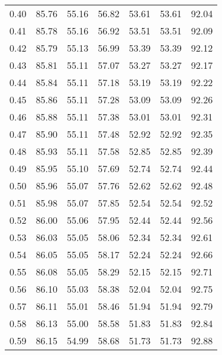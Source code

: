 \begin{tabular}{|c|c|c|c|c|c|c|}
      0.40 &     85.76 &     55.16 &      56.82 &   53.61 &      53.61 &         92.04 \\
      0.41 &     85.78 &     55.16 &      56.92 &   53.51 &      53.51 &         92.09 \\
      0.42 &     85.79 &     55.13 &      56.99 &   53.39 &      53.39 &         92.12 \\
      0.43 &     85.81 &     55.11 &      57.07 &   53.27 &      53.27 &         92.17 \\
      0.44 &     85.84 &     55.11 &      57.18 &   53.19 &      53.19 &         92.22 \\
      0.45 &     85.86 &     55.11 &      57.28 &   53.09 &      53.09 &         92.26 \\
      0.46 &     85.88 &     55.11 &      57.38 &   53.01 &      53.01 &         92.31 \\
      0.47 &     85.90 &     55.11 &      57.48 &   52.92 &      52.92 &         92.35 \\
      0.48 &     85.93 &     55.11 &      57.58 &   52.85 &      52.85 &         92.39 \\
      0.49 &     85.95 &     55.10 &      57.69 &   52.74 &      52.74 &         92.44 \\
      0.50 &     85.96 &     55.07 &      57.76 &   52.62 &      52.62 &         92.48 \\
      0.51 &     85.98 &     55.07 &      57.85 &   52.54 &      52.54 &         92.52 \\
      0.52 &     86.00 &     55.06 &      57.95 &   52.44 &      52.44 &         92.56 \\
      0.53 &     86.03 &     55.05 &      58.06 &   52.34 &      52.34 &         92.61 \\
      0.54 &     86.05 &     55.05 &      58.17 &   52.24 &      52.24 &         92.66 \\
      0.55 &     86.08 &     55.05 &      58.29 &   52.15 &      52.15 &         92.71 \\
      0.56 &     86.10 &     55.03 &      58.38 &   52.04 &      52.04 &         92.75 \\
      0.57 &     86.11 &     55.01 &      58.46 &   51.94 &      51.94 &         92.79 \\
      0.58 &     86.13 &     55.00 &      58.58 &   51.83 &      51.83 &         92.84 \\
      0.59 &     86.15 &     54.99 &      58.68 &   51.73 &      51.73 &         92.88 \\

\end{tabular}
